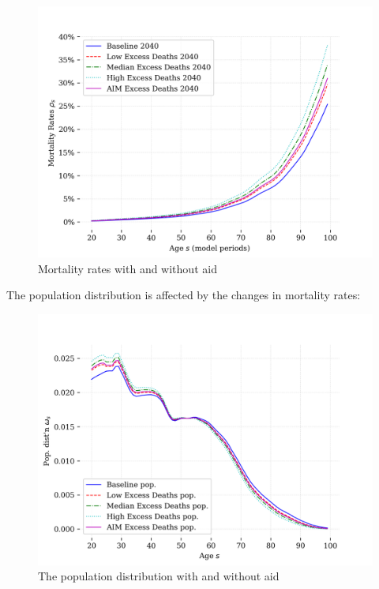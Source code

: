 \documentclass[letterpaper,12pt]{article}
\theoremstyle{definition}
\begin{document}
\begin{spacing}{1.5}
\begin{figure}[h]
    \caption{Mortality rates with and without aid}
    \centering
    \includegraphics[scale=0.75]{./tables_figures/mortality_rates.png}
\end{figure}


The population distribution is affected by the changes in mortality rates:
\begin{figure}[h]
    \caption{The population distribution with and without aid}
    \centering
    \includegraphics[scale=0.75]{./tables_figures/pop_dist_2050.png}
\end{figure}


\end{spacing}
\end{document}
